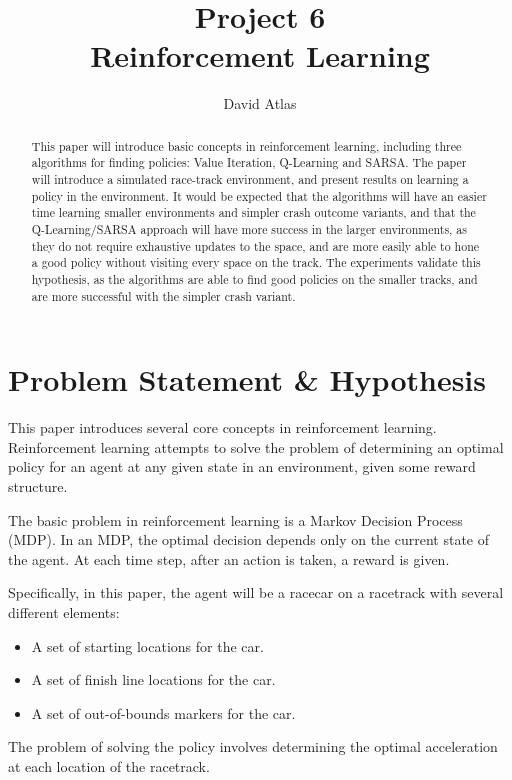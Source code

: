 \documentclass{amsart}
\title{Project 6 \\ Reinforcement Learning}
\author{David Atlas}
\begin{document}
    \begin{abstract}
    This paper will introduce basic concepts in reinforcement
    learning, including three algorithms for finding policies: Value Iteration, Q-Learning and SARSA.
        The paper will introduce a simulated race-track environment, and present results on
        learning a policy in the environment. It would be expected that the algorithms will
        have an easier time learning smaller environments and simpler crash outcome
        variants, and that the Q-Learning/SARSA
        approach will have more success in the larger environments, as they do not
        require exhaustive updates to the space, and are more easily able to hone a good policy
        without visiting every space on the track.
    The experiments validate this hypothesis, as the algorithms are able to find good policies
        on the smaller tracks, and are more successful with the simpler crash variant.
    \end{abstract}
    \maketitle

    \section{Problem Statement \& Hypothesis}
    This paper introduces several core concepts in reinforcement learning. Reinforcement
    learning attempts to solve the problem of determining an optimal policy for an agent at any
    given state in an environment, given some reward structure.

    The basic problem in reinforcement learning is a Markov Decision Process (MDP).
    In an MDP, the optimal decision depends only on the current state of the agent. At each time step,
    after an action is taken, a reward is given.

    Specifically, in this paper, the agent will be a racecar on a racetrack with several different
    elements:
    \begin{itemize}
        \item A set of starting locations for the car.
        \item A set of finish line locations for the car.
        \item A set of out-of-bounds markers for the car.
    \end{itemize}

    The problem of solving the policy involves determining the optimal acceleration at each location of the racetrack.
\end{document}
